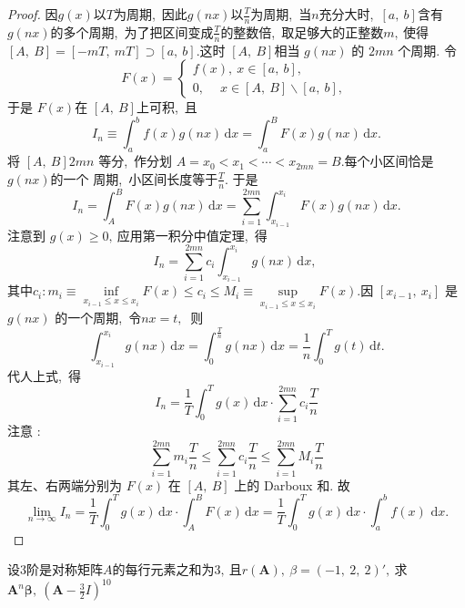 	\begin{proof}
		因$g(x)$以$T$为周期,\ 因此$g(nx)$以$\frac{T}{n}$为周期,\ 当$n$充分大时,\ $[a,\ b]$含有$g(nx)$的多个周期,\ 为了把区间变成$\frac{T}{n}$的整数倍,\ 取足够大的正整数$m,\ $使得
		$[A,\  B]=[-m T,\  m T] \supset[a,\  b] . $这时  $[A,\  B]  $相当  $g(n x) $ 的 $ 2 m n $ 个周期. 令
		$$F(x)=\left\{\begin{array}{l}
			f(x),\  x \in[a,\  b],\  \\
			0,\  \quad x \in[A,\  B] \backslash[a,\  b],\ 
		\end{array}\right.$$
		于是  $F(x)  $在 $ [A,\  B]  $上可积,\  且
		$$I_{n} \equiv \int_{a}^{b} f(x) g(n x) \,\mathrm{d} x=\int_{a}^{B} F(x) g(n x) \,\mathrm{d} x .$$
		将  $[A,\  B] 2 m n$  等分,\ 作分划  $A=x_{0}<x_{1}<\cdots<x_{2 m n}=B . $每个小区间恰是  $g(n x)  $的一个 周期,\ 小区间长度等于$  \frac{T}{n} .$ 于是
		$$I_{n}=\int_{A}^{B} F(x) g(n x) \,\mathrm{d} x=\sum_{i=1}^{2 m n} \int_{x_{i-1}}^{x_{i}} F(x) g(n x) \,\mathrm{d} x .$$
		注意到 $ g(x) \geqslant 0 ,\ $应用第一积分中值定理,\ 得
		$$I_{n}=\sum_{i=1}^{2 m n} c_{i} \int_{x_{i-1}}^{x_{i}} g(n x) \,\mathrm{d} x,\ $$
		其中$ c_{i}: m_{i} \equiv \inf\limits_{x_{i-1} \leqslant x \leqslant x_{i}} F(x) \leqslant c_{i} \leqslant M_{i} \equiv \sup \limits_{x_{i-1} \leqslant x \leqslant x_{i}} F(x) . $因  $\left[x_{i-1},\  x_{i}\right] $ 是 $ g(n x) $ 的一个周期,\  令$  n x=t ,\ $ 则
		$$\int_{x_{i-1}}^{x_{i}} g(n x) \,\mathrm{d} x=\int_{0}^{\frac{T}{n}} g(n x) \,\mathrm{d} x=\frac{1}{n} \int_{0}^{T} g(t) \,\mathrm{d} t .$$
		代人上式,\  得
		$$	I_{n}=\frac{1}{T} \int_{0}^{T} g(x) \,\mathrm{d} x \cdot \sum_{i=1}^{2 m n} c_{i} \frac{T}{n}$$
		注意 :	
		$$\sum_{i=1}^{2 m n} m_{i} \frac{T}{n} \leqslant \sum_{i=1}^{2 m n} c_{i} \frac{T}{n} \leqslant \sum_{i=1}^{2 m n} M_{i} \frac{T}{n}$$
		其左、右两端分别为 $ F(x)$  在 $ [A,\  B]$  上的 Darboux 和. 故
		$$\lim _{n \rightarrow \infty} I_{n}=\frac{1}{T} \int_{0}^{T} g(x) \,\mathrm{d} x \cdot \int_{A}^{B} F(x) \,\mathrm{d} x=\frac{1}{T} \int_{0}^{T} g(x) \,\mathrm{d} x \cdot \int_{a}^{b} f(x) \,\,\mathrm{d} x .$$
	\end{proof}
	\newpage
	\begin{problem}
		设$3$阶是对称矩阵$A$的每行元素之和为$3,\ $且$ r(\boldsymbol{A}),\ \beta=(-1,\ 2,\ 2)',\ $求$\boldsymbol{A}^n\boldsymbol{\beta},\ \left(\boldsymbol{A}-\frac{3}{2}I\right)^{10}$
	\end{problem}
